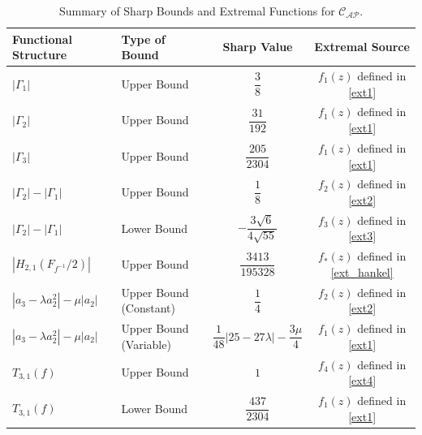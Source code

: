 \documentclass[10pt,a4paper]{amsart}
\numberwithin{equation}{section}
\begin{document}
\begin{table}[H]
\centering
\caption{Summary of Sharp Bounds and Extremal Functions for $\mathcal{C}_{\mathcal{AP}}$.}
\label{tab:extremal_summary}
\small
\addtolength{\tabcolsep}{4pt} 
\renewcommand{\arraystretch}{1.5} 
\begin{tabular}{llcc}
\toprule
\textbf{Functional Structure} & \textbf{Type of Bound} & \textbf{Sharp Value} & \textbf{Extremal Source} \\ \midrule
$|\Gamma_1|$ & Upper Bound & $\dfrac{3}{8}$ & $f_1(z)$ defined in \eqref{ext1} \\[2mm]
$|\Gamma_2|$ & Upper Bound & $\dfrac{31}{192}$ & $f_1(z)$ defined in \eqref{ext1} \\[2mm]
$|\Gamma_3|$ & Upper Bound & $\dfrac{205}{2304}$ & $f_1(z)$ defined in \eqref{ext1} \\[2mm]
$|\Gamma_2| - |\Gamma_1|$ & Upper Bound & $\dfrac{1}{8}$ & $f_2(z)$ defined in \eqref{ext2} \\[2mm]
$|\Gamma_2| - |\Gamma_1|$ & Lower Bound & $-\dfrac{3\sqrt{6}}{4\sqrt{55}}$ & $f_3(z)$ defined in \eqref{ext3} \\[2mm]
$\left| H_{2,1}\left(F_{f^{-1}} / 2\right)\right|$ & Upper Bound & $\dfrac{3413}{195328}$ & $f_*(z)$ defined in \eqref{ext_hankel} \\[2mm]
$|a_3 - \lambda a_2^2| - \mu |a_2|$ & Upper Bound (Constant) & $\dfrac{1}{4}$ & $f_2(z)$ defined in \eqref{ext2} \\[2mm]
$|a_3 - \lambda a_2^2| - \mu |a_2|$ & Upper Bound (Variable) & $\dfrac{1}{48} |25 - 27\lambda| - \dfrac{3\mu}{4}$ & $f_1(z)$ defined in \eqref{ext1} \\[2mm]
$T_{3,1}(f)$ & Upper Bound & $1$ & $f_4(z)$ defined in \eqref{ext4} \\[2mm]
$T_{3,1}(f)$ & Lower Bound & $\dfrac{437}{2304}$ & $f_1(z)$ defined in \eqref{ext1} \\ \bottomrule
\end{tabular}
\end{table}
\end{document}
